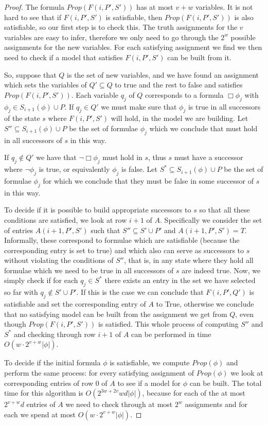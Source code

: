 \documentclass{llncs}
\begin{document}
\begin{proof}
The formula $Prop(F(i,P',S'))$ has at most $v+w$ variables. It is not hard to see
that if $F(i,P',S')$ is satisfiable, then $Prop(F(i,P',S'))$ is also satisfiable,
so our first step is to check this. The truth assignments for the $v$ variables
are easy to infer, therefore we only need to go through the $2^w$ possible assignments
for the new variables. For each satisfying assignment we find we then need to
check if a model that satisfies $F(i,P',S')$ can be built from it.

So, suppose that $Q$ is the set of new variables, and we have found an assignment
which sets the variables of $Q'\subseteq Q$ to true and the rest to false and
satisfies $Prop(F(i,P',S'))$. Each variable $q_j$ of $Q$ corresponds to a formula
$\Box \phi_j$ with $\phi_j\in S_{i+1}(\phi)\cup P$. If $q_j\in Q'$ we must make sure that
$\phi_j$ is true in all successors of the state $s$ where $F(i,P',S')$ will hold, in
the model we are building. Let $S''\subseteq S_{i+1}(\phi)\cup P$ be the set of formulae $\phi_j$
which we conclude that must hold in all successors of $s$ in this way.

If $q_j\not\in Q'$ we have that $\neg \Box \phi_j$ must
hold in $s$, thus $s$ must have a successor where $\neg \phi_j$ is true, or equivalently
$\phi_j$ is false. Let $S^{*}\subseteq S_{i+1}(\phi)\cup P$ be the set of formulae $\phi_j$
for which we conclude that they must be false in some successor of $s$ in this way.

To decide if it is possible to build appropriate successors to $s$
so that all these conditions are satisfied, we look at row $i+1$ of $A$. Specifically
we consider the set of entries $A(i+1,P',S')$ such that $S''\subseteq S'\cup P'$ and
$A(i+1,P',S')=T$. Informally, these correspond to formulae which are satisfiable
(because the corresponding entry is set to true) and which also can serve as successors
to $s$ without violating the conditions of $S''$, that is, in any state where they hold
all formulae which we need to be true in all successors of $s$ are indeed true. Now, we
simply check if for each $q_j\in S^{*}$ there exists an entry in the set we have
selected so far with $q_j\not\in S'\cup P'$. If this is the case we can conclude that $F(i,P',Q')$
is satisfiable and set the corresponding entry of $A$ to True, otherwise we conclude that
no satisfying model can be built from the assignment we get from $Q$, even though
$Prop(F(i,P',S'))$ is satisfied. This whole process of computing $S''$ and $S^{*}$
and checking through row $i+1$ of $A$ can be performed in time $O(w\cdot 2^{v+w}|\phi|)$.

To decide if the initial formula $\phi$ is satisfiable, we compute $Prop(\phi)$ and
perform the same process: for every satisfying assignment of $Prop(\phi)$ we look at
corresponding entries of row $0$ of $A$ to see if a model for $\phi$ can be built. The
total time for this algorithm is $O(2^{3w+2v}wd|\phi|)$, because for each of the at most
$2^{v+w}d$ entries of $A$ we need to check through at most $2^w$ assignments and for each
we spend at most $O(w\cdot 2^{v+w}|\phi|)$.



\end{proof}
 
\end{document}
